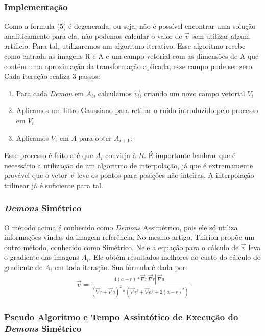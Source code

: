 \subsubsection{Implementação}
    Como a formula (5) é degenerada, ou seja, não é possível encontrar uma solução analiticamente para ela,
não podemos calcular o valor de $\vec{v}$ sem utilizar algum artificio. Para tal,
utilizaremos um algoritmo iterativo. Esse algoritmo recebe como entrada as imagens R e A e um campo vetorial
com as dimensões de A que contém uma aproximação da transformação aplicada, esse campo pode ser zero.
Cada iteração realiza 3 passos:
\begin{enumerate}
    \item Para cada \textit{Demon} em $A_i$, calculamos $\vec{v_i}$, criando um novo campo vetorial $V_i$
    \item Aplicamos um filtro Gaussiano para retirar o ruído introduzido pelo processo em $V_i$
    \item Aplicamos $V_i$ em $A$ para obter $A_{i+1}$;
\end{enumerate}
    Esse processo é feito até que $A_i$ convirja à $R$. É importante lembrar que é necessário a
utilização de um algoritmo de interpolação, já que é extremamente provável que o vetor $\vec{v}$
leve os pontos para posições não inteiras. A interpolação trilinear já é suficiente para tal.

\subsubsection{\textit{Demons} Simétrico}
    O método acima é conhecido como \textit{Demons} Assimétrico, pois ele só utiliza informações vindas
da imagem referência. No mesmo artigo, Thirion propõe um outro método, conhecido como Simétrico.
Nele a equação para o cálculo de $\vec{v}$ leva o gradiente das imagens $A_i$. Ele obtém resultados
melhores ao custo do cálculo do gradiente de $A_i$ em toda iteração. Sua fórmula é dada por:
\begin{align}\label{math:demons}
    \vec{v} = \frac{4(a - r)*\vec{\nabla}r|\vec{\nabla}r||\vec{\nabla}a|}
                    {(\vec{\nabla}r+\vec{\nabla}a)^2*(\vec{\nabla}r^2 + \vec{\nabla}a^2 + 2(a - r)^2)}
\end{align}

\subsubsection{Pseudo Algoritmo e Tempo Assintótico de Execução do \textit{Demons} Simétrico}

